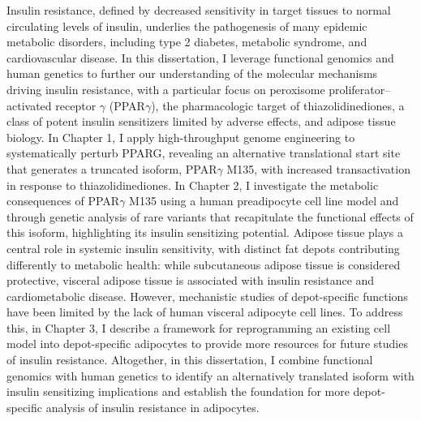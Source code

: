\documentclass[11pt]{formatting-template}
\begin{document}
\begin{dissertationabstract}
Insulin resistance, defined by decreased sensitivity in target tissues to normal circulating levels of insulin, underlies the pathogenesis of many epidemic metabolic disorders, including type 2 diabetes, metabolic syndrome, and cardiovascular disease. In this dissertation, I leverage functional genomics and human genetics to further our understanding of the molecular mechanisms driving insulin resistance, with a particular focus on peroxisome proliferator–activated receptor $\gamma$ (PPAR$\gamma$), the pharmacologic target of thiazolidinediones, a class of potent insulin sensitizers limited by adverse effects, and adipose tissue biology. In Chapter 1, I apply high-throughput genome engineering to systematically perturb PPARG, revealing an alternative translational start site that generates a truncated isoform, PPAR$\gamma$ M135, with increased transactivation in response to thiazolidinediones. In Chapter 2, I investigate the metabolic consequences of PPAR$\gamma$ M135 using a human preadipocyte cell line model and through genetic analysis of rare variants that recapitulate the functional effects of this isoform, highlighting its insulin sensitizing potential. Adipose tissue plays a central role in systemic insulin sensitivity, with distinct fat depots contributing differently to metabolic health: while subcutaneous adipose tissue is considered protective, visceral adipose tissue is associated with insulin resistance and cardiometabolic disease. However, mechanistic studies of depot-specific functions have been limited by the lack of human visceral adipocyte cell lines. To address this, in Chapter 3, I describe a framework for reprogramming an existing cell model into depot-specific adipocytes to provide more resources for future studies of insulin resistance. Altogether, in this dissertation, I combine functional genomics with human genetics to identify an alternatively translated isoform with insulin sensitizing implications and establish the foundation for more depot-specific analysis of insulin resistance in adipocytes.
\end{dissertationabstract}

\mainmatter{}
\end{document}
